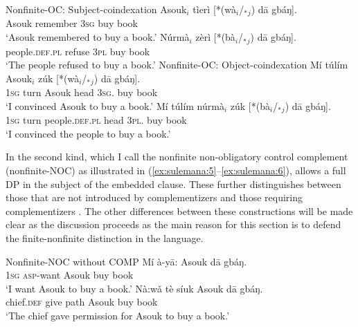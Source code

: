 \documentclass[output=paper,colorlinks,citecolor=brown]{langscibook}
\begin{document}
\ea%
    \label{ex:sulemana:3}
    Nonfinite-OC: Subject-coindexation
    \ea%
    \label{ex:sulemana:3a}
    \gll    Asouk$_i$ tìerì [*(wà$_i$/$_*${}$_j$) dā gbáŋ]. \\
            Asouk remember \textsc{3sg} buy book\\
    \glt    `Asouk remembered to buy a book.'
    \ex%
    \label{ex:sulemana:3b}
    \gll    Núrmà$_i$  zèrì [*(bà$_i$/$_*${}$_j$) dā gbáŋ]. \\
            people.\textsc{def.pl} refuse \textsc{3pl} buy book\\
    \glt    `The people refused to buy a book.'
    \z
\ex%
    \label{ex:sulemana:4}
    Nonfinite-OC: Object-coindexation
    \ea%
    \label{ex:sulemana:4a}
    \gll    Mí túlím Asouk$_i$ zúk [*(wà$_i$/$_*${}$_j$) dā gbáŋ]. \\
            \textsc{1sg} turn Asouk head \textsc{3sg}. buy book\\
    \glt    `I convinced Asouk to buy a book.'
    \ex%
    \label{ex:sulemana:4b}
    \gll    Mí túlím núrmà$_i$ zúk [*(bà$_i$/$_*${}$_j$) dā gbáŋ]. \\
            \textsc{1sg} turn people.\textsc{def.pl} head \textsc{3pl}. buy book\\
    \glt    `I convinced the people to buy a book.' 
    \z
\z

In the second kind, which I call the nonfinite non-obligatory control complement (nonfinite-NOC) as illustrated in (\ref{ex:sulemana:5}--\ref{ex:sulemana:6}),  allows a full DP in the subject of the embedded clause. These further distinguishes between those that are not introduced by complementizers  and those requiring complementizers . The other differences between these constructions will be made clear as the discussion proceeds as the main  reason for this section is to defend the finite-nonfinite distinction in the language. 

\ea%
    \label{ex:sulemana:5}
    Nonfinite-NOC without COMP
    \ea%
    \label{ex:sulemana:5a}
    \gll    Mí à-yā: Asouk dā gbáŋ.\\
            \textsc{1sg} \textsc{asp}-want Asouk buy book\\
    \glt    `I want Asouk to buy a book.' 
    \ex%
    \label{ex:sulemana:5b}
    \gll    Nà:wǎ tè síuk Asouk dā gbáŋ. \\
            chief.\textsc{def} give path Asouk buy book\\
    \glt    `The chief gave permission for Asouk to buy a book.' 
    \z
\z
\end{document}
